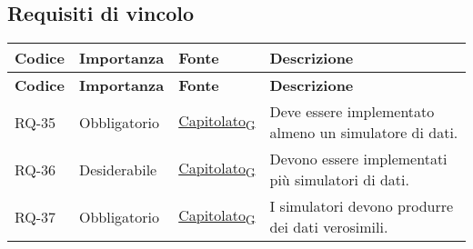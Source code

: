 \subsection{Requisiti di vincolo}
\begin{longtable}{|>{\centering\arraybackslash}m{}|>{\centering\arraybackslash}m{}|>{\centering\arraybackslash}m{}|>{\centering\arraybackslash}m{}|}
	\hline
	\textbf{Codice} & \textbf{Importanza} & \textbf{Fonte}                                                                                                    & \textbf{Descrizione}                                                                                                                                                                                                                                                                    \\\hline
	\endfirsthead
	\hline
	\textbf{Codice} & \textbf{Importanza} & \textbf{Fonte}                                                                                                    & \textbf{Descrizione}                                                                                                                                                                                                                                                                    \\\hline
	\endhead
	RQ-35           & Obbligatorio        & \href{https://7last.github.io/docs/rtb/documentazione-interna/glossario\#capitolato}{Capitolato\textsubscript{G}} & Deve essere implementato almeno un simulatore di dati.                                                                                                                                                                                                                                  \\\hline
	RQ-36           & Desiderabile        & \href{https://7last.github.io/docs/rtb/documentazione-interna/glossario\#capitolato}{Capitolato\textsubscript{G}} & Devono essere implementati più simulatori di dati.                                                                                                                                                                                                                                      \\\hline
	RQ-37           & Obbligatorio        & \href{https://7last.github.io/docs/rtb/documentazione-interna/glossario\#capitolato}{Capitolato\textsubscript{G}} & I simulatori devono produrre dei dati verosimili.                                                                                                                                                                                                                                       \\\hline

\end{longtable}

